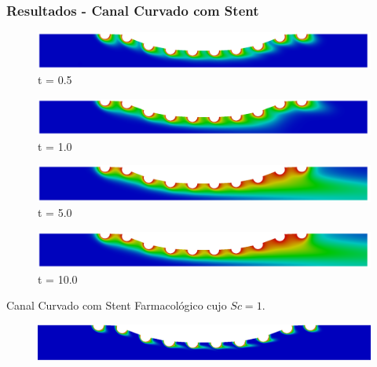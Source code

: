 \begin{frame}
 \frametitle{\Large Resultados - Canal Curvado com Stent}
\begin{figure}
     \begin{minipage}{.50\linewidth}
      \centering
      \includegraphics[scale=0.08]{images/conc1_CurvedStrut1000.png}\\
      \scriptsize t = 0.5
     \end{minipage}%
     \begin{minipage}{.50\linewidth}
      \centering
      \includegraphics[scale=0.08]{images/conc1_CurvedStrut2000.png}\\
      \scriptsize t = 1.0
     \end{minipage}
     \begin{minipage}{.50\linewidth}
     \medskip
      \centering
      \includegraphics[scale=0.08]{images/conc1_CurvedStrut10000.png}\\
      \scriptsize t = 5.0
     \end{minipage}%
     \begin{minipage}{.50\linewidth}
     \medskip
      \centering
      \includegraphics[scale=0.08]{images/conc1_CurvedStrut20000.png}\\
      \scriptsize t = 10.0
     \end{minipage}
\end{figure}
\vspace{0cm}
\centering \scriptsize Canal Curvado com Stent Farmacológico cujo $Sc=1$.
\vspace{0.5cm}
\begin{figure}
     \begin{minipage}{.50\linewidth}
      \centering
      \includegraphics[scale=0.08]{images/conc10_CurvedStrut2500.png}\\

\end{minipage}
\end{figure}
\end{frame}
